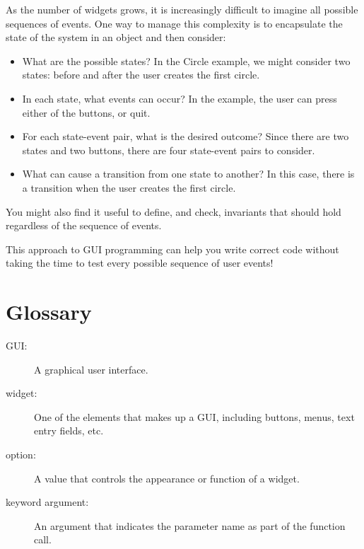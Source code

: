 \documentclass[10pt]{book}
\begin{document}
{As the number of widgets grows, it is increasingly difficult to
imagine all possible sequences of events.  One way to manage this 
complexity is to encapsulate the state of the system in an object
and then consider:

\begin{itemize}

\item What are the possible states?  In the Circle example, we
might consider two states: before and after the user creates the
first circle.

\item In each state, what events can occur?  In the example,
the user can press either of the buttons, or quit.

\item For each state-event pair, what is the desired outcome?
Since there are two states and two buttons, there are four
state-event pairs to consider.

\item What can cause a transition from one state to another?
In this case, there is a transition when the user creates
the first circle.

\end{itemize}

You might also find it useful to define, and check, invariants that
should hold regardless of the sequence of events.


This approach to GUI programming can help you write correct
code without taking the time to test every possible sequence
of user events!


\section{Glossary}

\begin{description}

\item[GUI:] A graphical user interface.

\item[widget:] One of the elements that makes up a GUI, including
buttons, menus, text entry fields, etc. 

\item[option:] A value that controls the appearance or function of
a widget.

\item[keyword argument:] An argument that indicates the parameter
name as part of the function call.


\end{description}}
\end{document}
